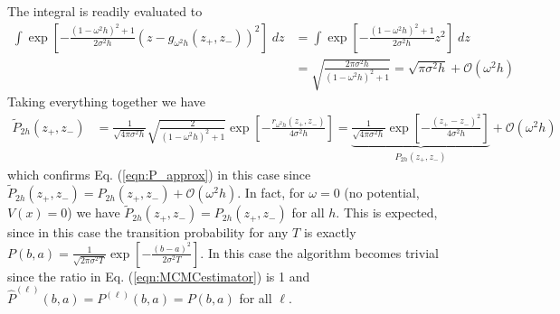 \documentclass{article}
\begin{document}
The integral is readily evaluated to
\begin{equation}
\begin{aligned}
\int 
\exp\left[
-\frac{(1-\omega^2h)^2+1}{2\sigma^2h}(z-g_{\omega^2h}(z_+,z_-))^2
\right]\;dz &= 
\int 
\exp\left[
-\frac{(1-\omega^2h)^2+1}{2\sigma^2h}z^2
\right]\;dz\\
&= \sqrt{\frac{2\pi\sigma^2 h}{(1-\omega^2h)^2+1}} = \sqrt{\pi\sigma^2h}+\mathcal{O}(\omega^2h)
\end{aligned}
\end{equation}
Taking everything together we have
\begin{equation}
\begin{aligned}
\tilde{P}_{2h}(z_+,z_-) &= \frac{1}{\sqrt{4\pi\sigma^2 h}}\sqrt{\frac{2}{(1-\omega^2h)^2+1}}
\exp\left[
-\frac{r_{\omega^2h}(z_+,z_-)}{4\sigma^2h}
\right] = \underbrace{\frac{1}{\sqrt{4\pi\sigma^2h}}\exp\left[
-\frac{(z_+-z_-)^2}{4\sigma^2h}\right]}_{P_{2h}(z_+,z_-)}+\mathcal{O}(\omega^2h)
\end{aligned}
\end{equation}
which confirms Eq. (\ref{eqn:P_approx}) in this case since $\tilde{P}_{2h}(z_+,z_-)=P_{2h}(z_+,z_-)+\mathcal{O}(\omega^2h)$. In fact, for $\omega=0$ (no potential, $V(x)=0$) we have $\tilde{P}_{2h}(z_+,z_-)=P_{2h}(z_+,z_-)$ for all $h$. This is expected, since in this case the transition probability for any $T$ is exactly $P(b,a)=\frac{1}{\sqrt{2\pi\sigma^2T}}\exp\left[-\frac{(b-a)^2}{2\sigma^2T}\right]$. In this case the algorithm becomes trivial since the ratio in Eq. (\ref{eqn:MCMCestimator}) is 1 and $\hat{P}^{(\ell)}(b,a)=P^{(\ell)}(b,a)=P(b,a)$ for all $\ell$.
\end{document}
